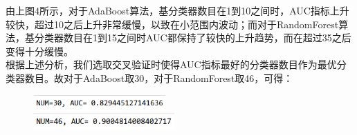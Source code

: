 \documentclass[a4paper,UTF8]{article}
\theoremstyle{definition}
\begin{document}
\noindent 由上图4所示，对于AdaBoost算法，基分类器数目在1到10之间时，AUC指标上升较快，超过10之后上升非常缓慢，以致在小范围内波动；而对于RandomForest算法，基分类器数目在1到15之间时AUC都保持了较快的上升趋势，而在超过35之后变得十分缓慢。\\
根据上述分析，我们选取交叉验证时使得AUC指标最好的分类器数目作为最优分类器数目。故对于AdaBoost取30，对于RandomForest取46，可得：
\begin{figure}[H] %
\centering %
\includegraphics[width=0.45\textwidth]{ada_auc.png} %
\\[3pt]\includegraphics[width=0.48\textwidth]{rf_auc.png}
\end{figure}
\end{document}
